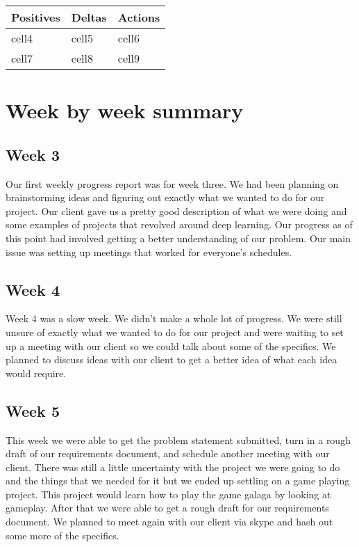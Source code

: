 \documentclass[onecolumn, draftclsnofoot,10pt, compsoc]{IEEEtran}
\begin{document}
\begin{center}
\begin{tabu} to 0.3\linewidth{ || X[l] | X[c] | X[r] || } 
	\hline
	Positives & Deltas & Actions \\
	\hline\hline
	cell4 & cell5 & cell6 \\ 
	cell7 & cell8 & cell9 \\ 
	\hline
\end{tabu}
\end{center}

\section{Week by week summary}

\subsection{Week 3}
Our first weekly progress report was for week three.
We had been planning on brainstorming ideas and figuring out exactly what we wanted to do for our project.
Our client gave us a pretty good description of what we were doing and some examples of projects that revolved around deep learning.
Our progress as of this point had involved getting a better understanding of our problem.
Our main issue was setting up meetings that worked for everyone's schedules.

\subsection{Week 4}
Week 4 was a slow week.
We didn't make a whole lot of progress.
We were still unsure of exactly what we wanted to do for our project and were waiting to set up a meeting with our client so we could talk about some of the specifics.
We planned to discuss ideas with our client to get a better idea of what each idea would require.

\subsection{Week 5}
This week we were able to get the problem statement submitted, turn in a rough draft of our requirements document, and schedule another meeting with our client.
There was still a little uncertainty with the project we were going to do and the things that we needed for it but we ended up settling on a game playing project.
This project would learn how to play the game galaga by looking at gameplay.
After that we were able to get a rough draft for our requirements document.
We planned to meet again with our client via skype and hash out some more of the specifics.
\end{document}
